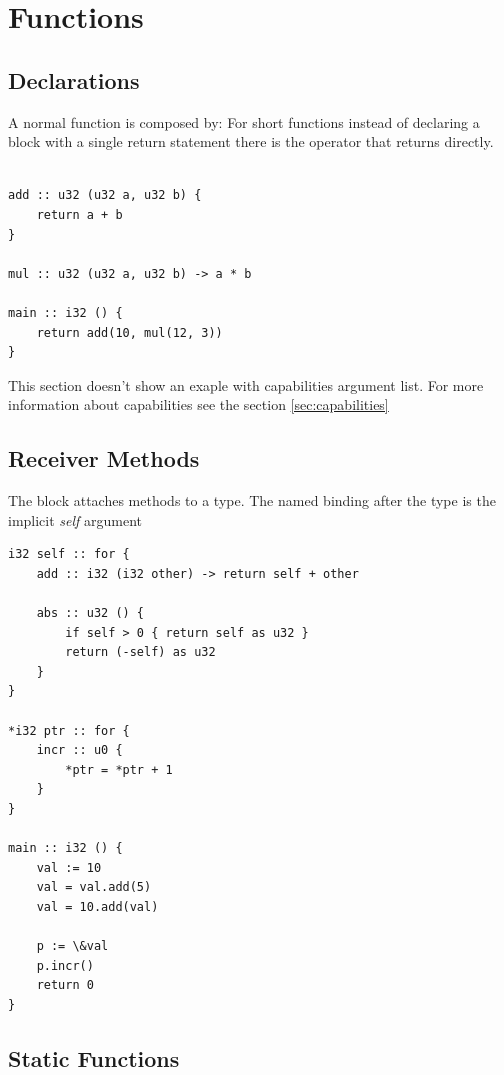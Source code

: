 \section{Functions}

\subsection{Declarations}
A normal function is composed by:
For short functions instead of declaring a block with a single return statement there is the \zn{->} operator that returns directly.

\begin{lstlisting}[style=zinc, caption={Function declarations}]

add :: u32 (u32 a, u32 b) {
    return a + b
}

mul :: u32 (u32 a, u32 b) -> a * b

main :: i32 () {
    return add(10, mul(12, 3))
}
\end{lstlisting}

\begin{note}
This section doesn't show an exaple with capabilities argument list.
For more information about capabilities see the section \ref{sec:capabilities}
\end{note}

\subsection{Receiver Methods}
The  block attaches methods to a type.
The named binding after the type is the implicit \emph{self} argument

\begin{lstlisting}[style=zinc, caption={Receiver methods}]
i32 self :: for {
    add :: i32 (i32 other) -> return self + other

    abs :: u32 () {
        if self > 0 { return self as u32 }
        return (-self) as u32
    }
}

*i32 ptr :: for {
    incr :: u0 {
        *ptr = *ptr + 1
    }
}

main :: i32 () {
    val := 10
    val = val.add(5)
    val = 10.add(val)

    p := \&val
    p.incr()
    return 0
}
\end{lstlisting}

\subsection{Static Functions}

